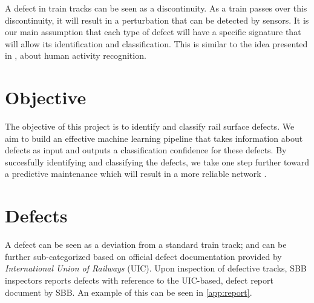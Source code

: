 A defect in train tracks can be seen as a discontinuity. As a train passes over this discontinuity, it will result in a perturbation that can be detected by sensors. It is our main assumption that each type of defect will have a specific signature that will allow its identification and classification. This is similar to the idea presented in \cite{Introduc31:online}, \cite{pmid28590422} about human activity recognition.

\section{Objective}
The objective of this project is to identify and classify rail surface defects. We aim to build an effective machine learning pipeline that takes information about defects as input and outputs a classification confidence for these defects. By succesfully identifying and classifying the defects, we take one step further toward a predictive maintenance which will result in a more reliable network \cite{unknown}.

\section{Defects}
\label{sec:defects}
A defect can be seen as a deviation from a standard train track; and can be further sub-categorized based on official defect documentation \cite{rail:online} provided by \textit{International Union of Railways} (UIC). Upon inspection of defective tracks, SBB inspectors reports defects with reference to the UIC-based, defect report document by SBB. An example of this can be seen in \ref{app:report}.

